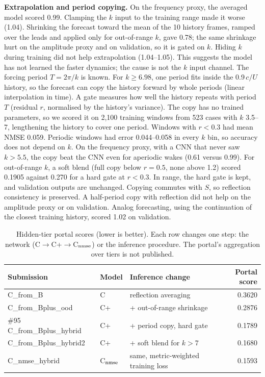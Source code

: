 \documentclass{article}
\begin{document}
\noindent\textbf{Extrapolation and period copying.}
On the frequency proxy, the averaged model scored 0.99. Clamping the
$k$ input to the training range made it worse (1.04). Shrinking the
forecast toward the mean of the 10 history frames, ramped over the
leads and applied only for out-of-range $k$, gave 0.78; the same
shrinkage hurt on the amplitude proxy and on validation, so it is
gated on $k$.
Hiding $k$ during training did not help extrapolation (1.04--1.05).
This suggests the model has not learned the faster dynamics; the cause
is not the $k$ input channel.
The forcing period $T=2\pi/k$ is known. For $k\ge6.98$, one period fits
inside the 0.9\,$c/U$ history, so the forecast can copy the history
forward by whole periods (linear interpolation in time). A gate measures
how well the history repeats with period $T$ (residual $r$, normalised
by the history's variance). The copy has no trained parameters, so we
scored it on 2,100 training windows from 523 cases with $k$ 3.5--7,
lengthening the history to cover one period. Windows with $r<0.3$ had
mean NMSE 0.059. Periodic windows had error 0.044--0.058 in every $k$
bin, so accuracy does not depend on $k$.
On the frequency proxy, with a CNN that never saw $k>5.5$, the copy beat
the CNN even for aperiodic wakes (0.61 versus 0.99).
For out-of-range $k$, a soft blend (full copy below $r=0.5$, none above
1.2) scored 0.1905 against 0.270 for a hard gate at $r<0.3$.
In range, the hard gate is kept, and validation outputs are unchanged.
Copying commutes with $S$, so reflection consistency is preserved.
A half-period copy with reflection did not help on the amplitude proxy
or on validation. Analog forecasting, using the continuation of the
closest training history, scored 1.02 on validation.

\begin{table}[!ht]
\centering
\begin{tabular}{@{}lllr@{}}
\toprule
Submission & Model & Inference change & Portal score\\
\midrule
C\_from\_B & C & reflection averaging & 0.3620\\
C\_from\_Bplus\_ood & C+ & + out-of-range shrinkage & 0.2876\\
\#95 C\_from\_Bplus\_hybrid & C+ & + period copy, hard gate & 0.1789\\
C\_from\_Bplus\_hybrid2 & C+ & + soft blend for $k>7$ & 0.1680\\
C\_nmse\_hybrid & C$_{\rm nmse}$ & same, metric-weighted training loss & 0.1593\\
\bottomrule
\end{tabular}
\caption{Hidden-tier portal scores (lower is better). Each row changes one
step: the network (C$\to$C+$\to$C$_{\rm nmse}$) or the inference procedure.
The portal's aggregation over tiers is not published.}
\label{tab:portal}
\end{table}
\end{document}
